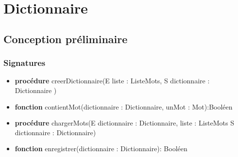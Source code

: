 \documentclass{article}
\begin{document}
    \pagestyle{empty}
    \noindent

    \section*{Dictionnaire}
    \subsection*{Conception préliminaire}
    \subsubsection*{Signatures}

	\begin{itemize}[label=$\ $, leftmargin=1cm]
		 \item \textbf{procédure} creerDictionnaire(E  liste : ListeMots, S dictionnaire : Dictionnaire )
		 \item \textbf{fonction} contientMot(dictionnaire : Dictionnaire, unMot : Mot):Booléen
         \item \textbf{procédure} chargerMots(E dictionnaire : Dictionnaire, liste : ListeMots S dictionnaire : Dictionnaire) 
         \item \textbf{fonction} enregistrer(dictionnaire : Dictionnaire): Booléen
	\end{itemize}
	
 
\end{document}
